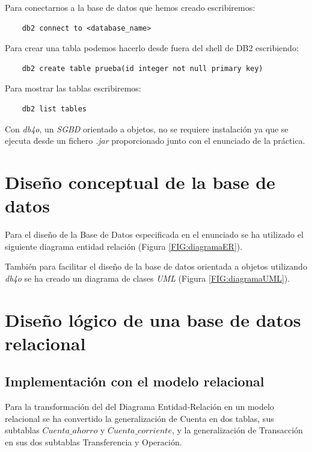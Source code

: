 \documentclass{article}
\begin{document}
Para conectarnos a la base de datos que hemos creado escribiremos:
\begin{lstlisting}
    db2 connect to <database_name>
\end{lstlisting}

Para crear una tabla podemos hacerlo desde fuera del shell de DB2 escribiendo:
\begin{lstlisting}
    db2 create table prueba(id integer not null primary key)
\end{lstlisting}

Para mostrar las tablas escribiremos:
\begin{lstlisting}
    db2 list tables
\end{lstlisting}

Con \emph{db4o}, un \emph{SGBD} orientado a objetos, no se requiere instalación ya que se ejecuta desde un fichero \emph{.jar} proporcionado junto con el enunciado de la práctica.


\section{Diseño conceptual de la base de datos}

Para el diseño de la Base de Datos especificada en el enunciado se ha utilizado el siguiente diagrama entidad relación (Figura \ref{FIG:diagramaER}).

También para facilitar el diseño de la base de datos orientada a objetos utilizando \emph{db4o} se ha creado un diagrama de clases \emph{UML} (Figura \ref{FIG:diagramaUML}).



\section{Diseño lógico de una base de datos relacional}

\subsection{Implementación con el modelo relacional}

Para la transformación del del Diagrama Entidad-Relación en un modelo relacional se ha convertido la generalización de Cuenta en dos tablas, sus subtablas $Cuenta\_ahorro$ y $Cuenta\_corriente$, y la generalización de Transacción en sus dos subtablas Transferencia y Operación.\\
\end{document}
